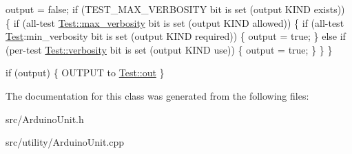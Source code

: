 output = false; if (T\-E\-S\-T\-\_\-\-M\-A\-X\-\_\-\-V\-E\-R\-B\-O\-S\-I\-T\-Y bit is set (output K\-I\-N\-D exists)) \{ if (all-\/test \hyperlink{class_test_aad3dc21628f5210b9ebdf843eb2b2ae0}{Test\-::max\-\_\-verbosity} bit is set (output K\-I\-N\-D allowed)) \{ if (all-\/test \hyperlink{class_test}{Test}\-:min\-\_\-verbosity bit is set (output K\-I\-N\-D required)) \{ output = true; \} else if (per-\/test \hyperlink{class_test_aa0489f064ae55a20229646a584110a39}{Test\-::verbosity} bit is set (output K\-I\-N\-D use)) \{ output = true; \} \} \}

if (output) \{ O\-U\-T\-P\-U\-T to \hyperlink{class_test_a33e59751992ec1a8a65745c0b6b144b0}{Test\-::out} \} 

The documentation for this class was generated from the following files\-:\begin{DoxyCompactItemize}
\item 
src/Arduino\-Unit.\-h\item 
src/utility/Arduino\-Unit.\-cpp\end{DoxyCompactItemize}
